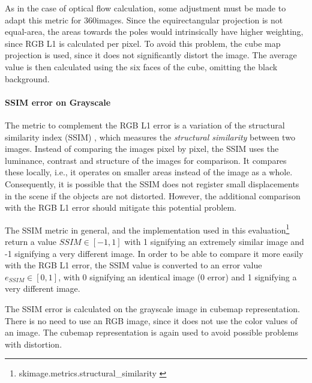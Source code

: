 As in the case of optical flow calculation, some adjustment must be made to adapt this metric for 360\degree images. Since the equirectangular projection is not equal-area, the areas towards the poles would intrinsically have higher weighting, since RGB L1 is calculated per pixel. To avoid this problem, the cube map projection is used, since it does not significantly distort the image. The average value is then calculated using the six faces of the cube, omitting the black background.

\paragraph{SSIM error on Grayscale}
The metric to complement the RGB L1 error is a variation of the structural similarity index (SSIM) \cite{ssim}, which measures the \emph{structural similarity} between two images. Instead of comparing the images pixel by pixel, the SSIM uses the luminance, contrast and structure of the images for comparison. It compares these locally, i.e., it operates on smaller areas instead of the image as a whole. Consequently, it is possible that the SSIM does not register small displacements in the scene if the objects are not distorted. However, the additional comparison with the RGB L1 error should mitigate this potential problem.

The SSIM metric in general, and the implementation used in this evaluation\footnote{skimage.metrics.structural\_similarity \cite{skimage}} return a value $SSIM \in [-1, 1]$ with 1 signifying an extremely similar image and -1 signifying a very different image. In order to be able to compare it more easily with the RGB L1 error, the SSIM value is converted to an error value $ e_{SSIM} \in [0,1]$, with 0 signifying an identical image (0 error) and 1 signifying a very different image.

The SSIM error is calculated on the grayscale image in cubemap representation. There is no need to use an RGB image, since it does not use the color values of an image. The cubemap representation is again used to avoid possible problems with distortion.

